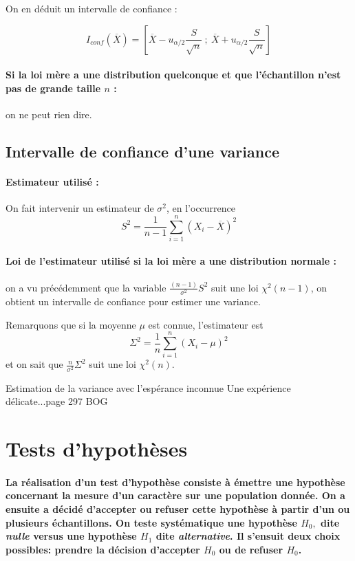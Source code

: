 On en déduit un intervalle de confiance :

$$I_{conf}(\overline{X})=\left[\overline{X}-u_{\alpha/2} \frac{S}{\sqrt{n}}~;~\overline{X} + u_{\alpha/2} \frac{S}{\sqrt{n}} \right]$$

\paragraph{Si la loi mère a une distribution quelconque et que l'échantillon n'est pas de grande taille $n$ :} on ne peut rien dire.



 \subsection{Intervalle de confiance d'une variance}
\paragraph{Estimateur utilisé :} On fait intervenir un estimateur de $\sigma^2$, en l'occurrence $$S^2=\frac{1}{n-1}\sum_{i=1}^n (X_i-\overline{X})^2$$

\paragraph{Loi de l'estimateur utilisé si la loi mère a une distribution normale :}  on a vu précédemment que la variable $\frac{(n-1)}{\sigma^2}S^2$ suit une loi $\chi^2(n-1)$, on obtient un intervalle de confiance pour estimer une variance. 

Remarquons que si la moyenne $\mu$ est connue, l'estimateur est 
$$\Sigma^2=\frac{1}{n}\sum_{i=1}^n (X_i-\mu)^2$$
et on sait que $\frac{n}{\sigma^2}\Sigma^2$ suit une loi $\chi^2(n)$.

\begin{exemple}{Estimation de la variance avec l'espérance inconnue}{}
Une expérience délicate...page 297 BOG


\end{exemple}


\section{Tests d'hypothèses}
\paragraph{La réalisation d'un test d'hypothèse consiste à émettre une hypothèse concernant la mesure d'un caractère sur une population donnée. On a ensuite a décidé d'accepter ou refuser cette hypothèse à partir d'un ou plusieurs échantillons. On teste systématique une hypothèse $H_0,$ dite {\it{nulle}} versus une hypothèse $H_{1}$ dite {\it{alternative}}. Il s'ensuit deux choix possibles: prendre la décision d'accepter $H_0$ ou de refuser $H_0$.}
